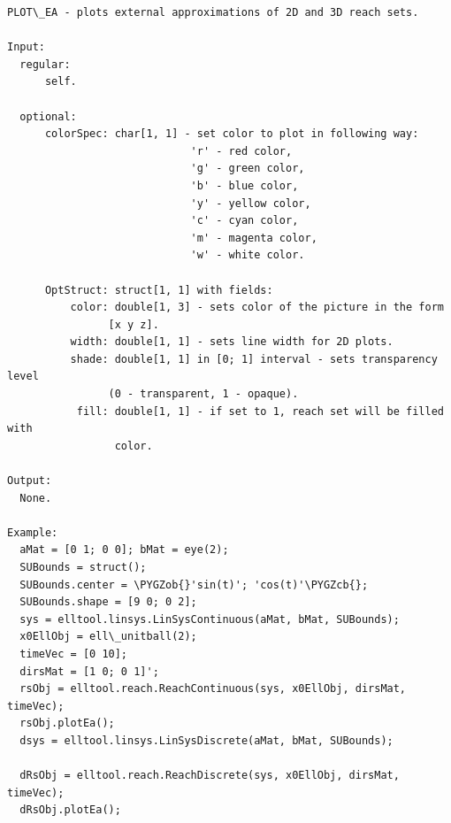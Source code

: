 \documentclass[letterpaper,10pt,english]{sphinxmanual}
\def\PYGZob{\char`\{}
\def\PYGZcb{\char`\}}
\begin{document}
\begin{Verbatim}[commandchars=\\\{\}]
PLOT\_EA - plots external approximations of 2D and 3D reach sets.

Input:
  regular:
      self.

  optional:
      colorSpec: char[1, 1] - set color to plot in following way:
                             'r' - red color,
                             'g' - green color,
                             'b' - blue color,
                             'y' - yellow color,
                             'c' - cyan color,
                             'm' - magenta color,
                             'w' - white color.

      OptStruct: struct[1, 1] with fields:
          color: double[1, 3] - sets color of the picture in the form
                [x y z].
          width: double[1, 1] - sets line width for 2D plots.
          shade: double[1, 1] in [0; 1] interval - sets transparency level
                (0 - transparent, 1 - opaque).
           fill: double[1, 1] - if set to 1, reach set will be filled with
                 color.

Output:
  None.

Example:
  aMat = [0 1; 0 0]; bMat = eye(2);
  SUBounds = struct();
  SUBounds.center = \PYGZob{}'sin(t)'; 'cos(t)'\PYGZcb{};
  SUBounds.shape = [9 0; 0 2];
  sys = elltool.linsys.LinSysContinuous(aMat, bMat, SUBounds);
  x0EllObj = ell\_unitball(2);
  timeVec = [0 10];
  dirsMat = [1 0; 0 1]';
  rsObj = elltool.reach.ReachContinuous(sys, x0EllObj, dirsMat, timeVec);
  rsObj.plotEa();
  dsys = elltool.linsys.LinSysDiscrete(aMat, bMat, SUBounds);

  dRsObj = elltool.reach.ReachDiscrete(sys, x0EllObj, dirsMat, timeVec);
  dRsObj.plotEa();
\end{Verbatim}
\end{document}
